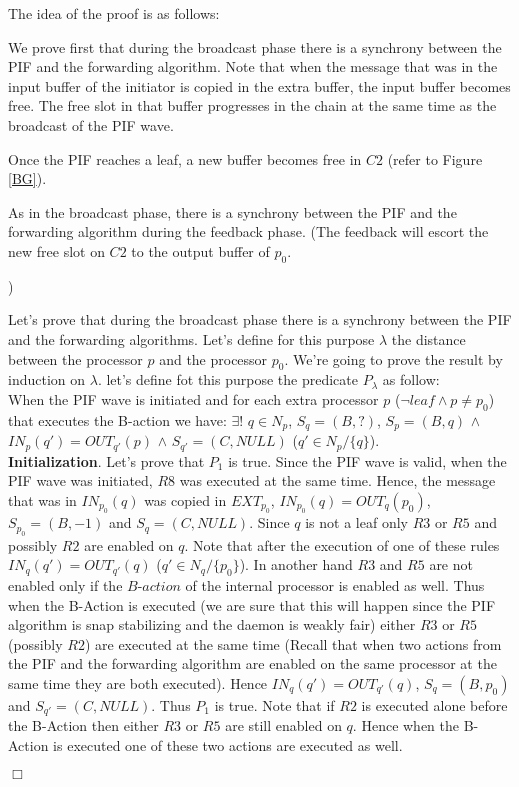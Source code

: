 \documentclass{llncs}
\renewenvironment{proof}{{\it Proof. } }{{\hfill $\Box$}\vspace{.5pc}}
\begin{document}
\begin{proof}
The idea of the proof is as follows: 
\begin{itemize}
\item{We prove first that during the broadcast phase there is a synchrony between the PIF and the forwarding
algorithm. Note that when the message that was in the input buffer of the initiator is copied in the extra buffer, the
input buffer becomes free. The free slot in that buffer progresses in the chain at the same time as the broadcast of the PIF
wave.}
\item{Once the PIF reaches a leaf, a new buffer becomes free in $C2$ (refer to Figure \ref{BG}).
\item{As in the broadcast phase, there is a synchrony between the PIF and the forwarding algorithm
during the feedback phase. (The feedback will escort the new free slot on $C2$ to the output buffer of $p_0$.}})
\end{itemize}

Let's prove that during the broadcast phase there is a synchrony between the PIF and the forwarding algorithms.
Let's define for this purpose $\lambda$ the distance between the processor $p$ and  the processor $p_{0}$. We're going to prove the result  by induction on $\lambda$. let's define fot this purpose the predicate $P_{\lambda}$ as follow: \\

When the PIF wave is initiated and for each extra processor $p$ ($\neg leaf \wedge p \ne p_0$) that executes the B-action we have: $\exists$! $q \in N_{p}$, $S_{q}=(B,?)$, $S_{p}=(B,q)$ $\wedge$  $IN_{p}(q')=OUT_{q'}(p)$ $\wedge$ $S_{q'}=(C,NULL)$ ($q' \in N_{p}/\{q\}$).\\

\textbf{Initialization}. Let's prove that $P_{1}$ is true. Since the PIF wave is valid, when the PIF wave was
initiated, $R8$ was executed at the same time. Hence, the message that was in $IN_{p_{0}}(q)$ was copied in
$EXT_{p_{0}}$, $IN_{p_{0}}(q)=OUT_{q}(p_{0})$, $S_{p_{0}}=(B,-1)$ and $S_{q}=(C,NULL)$. Since $q$ is not a leaf only
$R3$ or $R5$ and possibly $R2$ are enabled on $q$. Note that after the execution of one of these rules
$IN_{q}(q')=OUT_{q'}(q)$ ($q' \in N_{q}/\{p_{0}\}$). In another hand $R3$ and $R5$ are not enabled only if the
$B\mbox{-}action$ of the internal processor is enabled as well. Thus when the B-Action is executed (we are sure that this
will happen since the PIF algorithm is snap stabilizing and the daemon is weakly fair) either $R3$ or $R5$ (possibly
$R2$) are executed at the same time (Recall that when two actions from the PIF and the forwarding algorithm are
enabled on the same processor at the same time they are both executed). Hence $IN_{q}(q')=OUT_{q'}(q)$,
$S_{q}=(B,p_{0})$ and $S_{q'}=(C,NULL)$. Thus $P_{1}$ is true. Note that if $R2$ is executed alone before the B-Action
then either $R3$ or $R5$ are still enabled on $q$. Hence when the B-Action is executed one of these two actions are
executed as well.


\end{proof}
\end{document}
